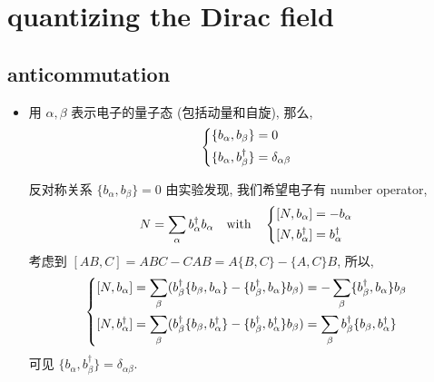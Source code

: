 \chapter{quantizing the Dirac field}
\section{anticommutation} \label{8.1}
\begin{itemize}
	\item 用 $\alpha, \beta$ 表示电子的量子态 (包括动量和自旋), 那么,
	\begin{equation}
		\begin{dcases}
			\{b_\alpha, b_\beta\} = 0 \\
			\{b_\alpha, b^\dag_\beta\} = \delta_{\alpha \beta}
		\end{dcases}
	\end{equation}
	
	\begin{tcolorbox}[title=comment:]
		反对称关系 $\{b_\alpha, b_\beta\} = 0$ 由实验发现, 我们希望电子有 number operator,
		\begin{equation}
			N = \sum_\alpha b^\dag_\alpha b_\alpha \quad \text{with} \quad \begin{dcases}
				[N, b_\alpha] = - b_\alpha \\
				[N, b^\dag_\alpha] = b^\dag_\alpha
			\end{dcases}
		\end{equation}
		考虑到 $[A B, C] = A B C - C A B = A \{B, C\} - \{A, C\} B$, 所以,
		\begin{equation}
			\begin{dcases}
				[N, b_\alpha] = \sum_\beta (b^\dag_\beta \{b_\beta, b_\alpha\} - \{b^\dag_\beta, b_\alpha\} b_\beta) = - \sum_\beta \{b^\dag_\beta, b_\alpha\} b_\beta \\
				[N, b^\dag_\alpha] = \sum_\beta (b^\dag_\beta \{b_\beta, b^\dag_\alpha\} - \{b^\dag_\beta, b^\dag_\alpha\} b_\beta) = \sum_\beta b^\dag_\beta \{b_\beta, b^\dag_\alpha\}
			\end{dcases}
		\end{equation}
		可见 $\{b_\alpha, b^\dag_\beta\} = \delta_{\alpha \beta}$.
	\end{tcolorbox}
\end{itemize}

